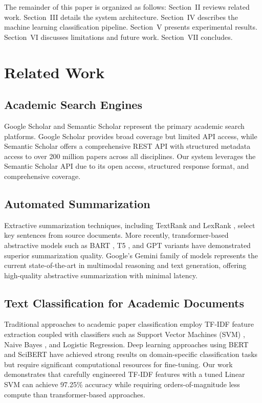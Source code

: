 \documentclass[conference]{IEEEtran}
\begin{document}
The remainder of this paper is organized as follows: Section~II reviews related work. Section~III details the system architecture. Section~IV describes the machine learning classification pipeline. Section~V presents experimental results. Section~VI discusses limitations and future work. Section~VII concludes.

\section{Related Work}

\subsection{Academic Search Engines}

Google Scholar \cite{google_scholar} and Semantic Scholar \cite{semantic_scholar} represent the primary academic search platforms. Google Scholar provides broad coverage but limited API access, while Semantic Scholar offers a comprehensive REST API with structured metadata access to over 200 million papers across all disciplines. Our system leverages the Semantic Scholar API due to its open access, structured response format, and comprehensive coverage.

\subsection{Automated Summarization}

Extractive summarization techniques, including TextRank \cite{textrank} and LexRank \cite{lexrank}, select key sentences from source documents. More recently, transformer-based abstractive models such as BART \cite{bart}, T5 \cite{t5}, and GPT variants have demonstrated superior summarization quality. Google's Gemini family of models \cite{gemini} represents the current state-of-the-art in multimodal reasoning and text generation, offering high-quality abstractive summarization with minimal latency.

\subsection{Text Classification for Academic Documents}

Traditional approaches to academic paper classification employ TF-IDF feature extraction coupled with classifiers such as Support Vector Machines (SVM) \cite{joachims_text}, Naive Bayes \cite{mccallum_comparison}, and Logistic Regression. Deep learning approaches using BERT \cite{bert} and SciBERT \cite{scibert} have achieved strong results on domain-specific classification tasks but require significant computational resources for fine-tuning. Our work demonstrates that carefully engineered TF-IDF features with a tuned Linear SVM can achieve 97.25\% accuracy while requiring orders-of-magnitude less compute than transformer-based approaches.
\end{document}
